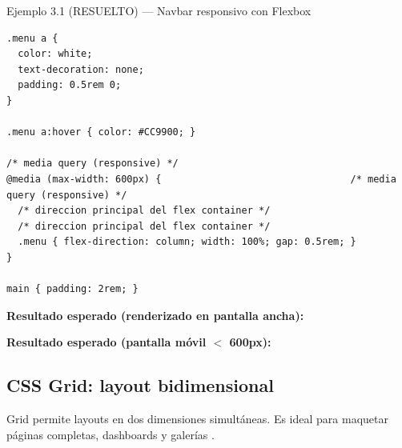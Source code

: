 \begin{cajaejemplo}{Ejemplo 3.1 (RESUELTO) --- Navbar responsivo con Flexbox}
\begin{lstlisting}[style=css,caption={navbar.css},label=lst:3.5]
.menu a {
  color: white;
  text-decoration: none;
  padding: 0.5rem 0;
}

.menu a:hover { color: #CC9900; }

/* media query (responsive) */
@media (max-width: 600px) {                                 /* media query (responsive) */
  /* direccion principal del flex container */
  /* direccion principal del flex container */
  .menu { flex-direction: column; width: 100%; gap: 0.5rem; }
}

main { padding: 2rem; }
\end{lstlisting}

\textbf{Resultado esperado (renderizado en pantalla ancha):}


\textbf{Resultado esperado (pantalla móvil $<$ 600px):}

\end{cajaejemplo}

\subsection{CSS Grid: layout bidimensional}

Grid permite layouts en dos dimensiones simultáneas. Es ideal para
maquetar páginas completas, dashboards y galerías
\cite{macdonald2018css}.


